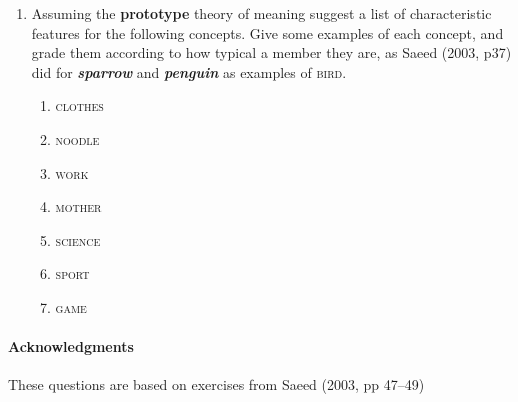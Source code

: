 \documentclass[a4paper]{article}
\newcommand{\lex}[1]{\textbf{\textit{#1}}}
\newcommand{\con}[1]{\textsc{#1}}
\newcommand{\txx}[1]{\textbf{#1}}
\begin{document}
\begin{enumerate}
\item Assuming the \txx{prototype} theory of meaning suggest a list of
  characteristic features for the following concepts.  Give some
  examples of each concept, and grade them according to how typical a
  member they are, as Saeed (2003, p37) did for \lex{sparrow} and
  \lex{penguin} as examples of \con{bird}.
  \begin{enumerate}
  \item \con{clothes}
  \item \con{noodle}
  \item \con{work}
  \item \con{mother}
  \item \con{science}
  \item \con{sport}
  \item \con{game}
  \end{enumerate}

\end{enumerate}

\vfill
\paragraph{Acknowledgments} These questions are based on exercises from 
 Saeed (2003, pp 47--49)
\end{document}
